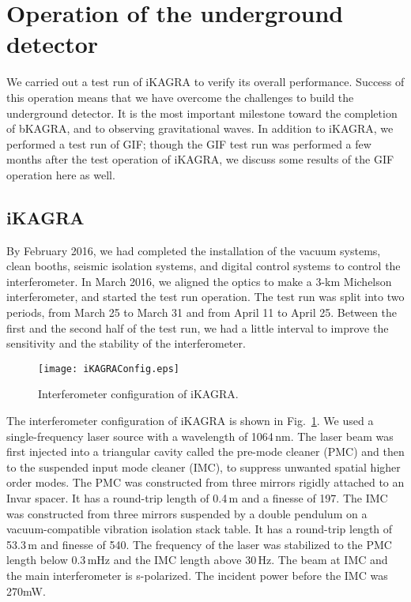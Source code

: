 \documentclass[prd ,twocolumn ,secnumarabic,dvips
,amssymb, amsmath,nobibnotes, aps, prd,superscriptaddress]{revtex4-1}
\begin{document}
{\section{Operation of the underground detector}\label{sec:5}
We carried out a test run of iKAGRA to verify its overall performance. Success of this operation means that we have overcome the challenges to build the underground detector. It is the most important milestone toward the completion of bKAGRA, and to observing gravitational waves. In addition to iKAGRA, we performed a test run of GIF; though the GIF test run was performed a few months after the test operation of iKAGRA, we discuss some results of the GIF operation here as well.
\subsection{iKAGRA}\label{sec:iKAGRA}
%
By February 2016, we had completed the installation of the vacuum systems, clean booths, seismic isolation systems, and digital control systems to control the interferometer. In March 2016, we aligned the optics to make a 3-km Michelson interferometer, and started the test run operation. The test run was split into two periods, from March 25 to March 31 and from April 11 to April 25. Between the first and the second half of the test run, we had a little interval to improve the sensitivity and the stability of the interferometer.

\begin{figure}[htbp]
	\begin{center}
		\texttt{[image: iKAGRAConfig.eps]}
		\caption{\label{fig:iKAGRAConfig}Interferometer configuration of iKAGRA.}
	\end{center}
\end{figure}

The interferometer configuration of iKAGRA is shown in Fig.~\ref{fig:iKAGRAConfig}. We used a single-frequency laser source with a wavelength of 1064\,nm. The laser beam was first injected into a triangular cavity called the pre-mode cleaner (PMC) and then to the suspended input mode cleaner (IMC), to suppress unwanted spatial higher order modes. The PMC was constructed from three mirrors rigidly attached to an Invar spacer. It has a round-trip length of 0.4\,m and a finesse of 197. The IMC was constructed from three mirrors suspended by a double pendulum on a vacuum-compatible vibration isolation stack table. It has a round-trip length of 53.3\,m and finesse of 540. The frequency of the laser was stabilized to the PMC length below 0.3\,mHz and the IMC length above 30\,Hz. 
The beam at IMC and the main interferometer is s-polarized. The incident power before the IMC was 270mW.

}
\end{document}
